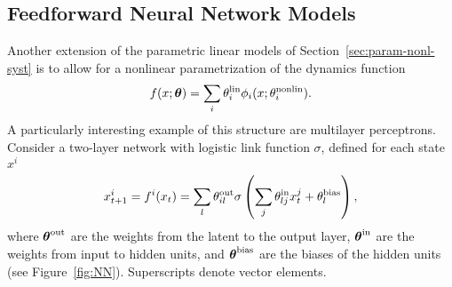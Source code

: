 \subsection{Feedforward Neural Network Models}
\label{sec:dual-control-of-feedforward-neural-networks}

Another extension of the parametric linear models of
Section~\ref{sec:param-nonl-syst} is to allow for a nonlinear parametrization
of the dynamics function
\begin{equation}
  \label{eq:7}
  f(x;\boldsymbol{\t}) = \sum_i \theta^\text{lin} _i \phi_i(x;\theta_i
  ^\text{nonlin}).
\end{equation}
A particularly interesting example of this structure are multilayer perceptrons.
Consider a two-layer network with logistic link function $\sigma$, defined for
each state $x^i$
\begin{equation}
  \label{eq:8}
  x^i_{\tk+1}=f^i(x_\tk)= \sum_l {\t}^\text{out}_{il}
      \sigma\left( \sum_{j} {\t}^\text{in}_{lj} x^j_\tk
    + {\t}^\text{bias}_l \right),
\end{equation}
%
%
%
where $\boldsymbol{\theta}^\text{out}$ are the weights from the latent to the
output layer, $\boldsymbol{\theta}^\text{in}$ are the weights from input to hidden
units, and $\boldsymbol{\theta}^\text{bias}$ are the biases of the hidden units (see
Figure~\ref{fig:NN}). Superscripts denote vector elements.

\begin{figure*}
  \normalsize
  \centering
  \caption[Two-layer feed-forward neural network.]{Two-layer feed-forward
  neural network. Sketch to illustrate the structure of Equation~\eqref{eq:8}.}
  \label{fig:NN}
\end{figure*}

